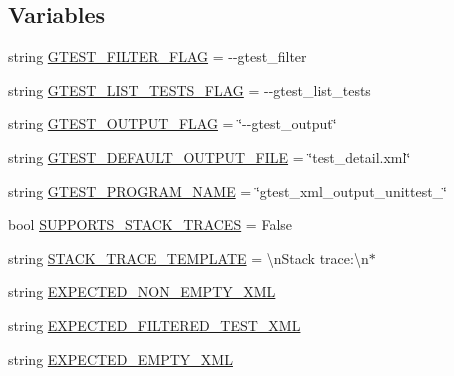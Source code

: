 \subsection*{Variables}
\begin{DoxyCompactItemize}
\item 
string \hyperlink{namespacegtest__xml__output__unittest_ab914acfbfbc3f6f5ee3f1e83134c7204}{G\+T\+E\+S\+T\+\_\+\+F\+I\+L\+T\+E\+R\+\_\+\+F\+L\+AG} = \textquotesingle{}-\/-\/gtest\+\_\+filter\textquotesingle{}
\item 
string \hyperlink{namespacegtest__xml__output__unittest_aafe4dd234e72bbb61f4f34689fbca5c4}{G\+T\+E\+S\+T\+\_\+\+L\+I\+S\+T\+\_\+\+T\+E\+S\+T\+S\+\_\+\+F\+L\+AG} = \textquotesingle{}-\/-\/gtest\+\_\+list\+\_\+tests\textquotesingle{}
\item 
string \hyperlink{namespacegtest__xml__output__unittest_a96dc60b3ea1b2ced315835227f77e10d}{G\+T\+E\+S\+T\+\_\+\+O\+U\+T\+P\+U\+T\+\_\+\+F\+L\+AG} = \char`\"{}-\/-\/gtest\+\_\+output\char`\"{}
\item 
string \hyperlink{namespacegtest__xml__output__unittest_a5591d7d52a46da09d06ed3e9ec18711a}{G\+T\+E\+S\+T\+\_\+\+D\+E\+F\+A\+U\+L\+T\+\_\+\+O\+U\+T\+P\+U\+T\+\_\+\+F\+I\+LE} = \char`\"{}test\+\_\+detail.\+xml\char`\"{}
\item 
string \hyperlink{namespacegtest__xml__output__unittest_ab89cc5b402310ef67bcaf38fa5017461}{G\+T\+E\+S\+T\+\_\+\+P\+R\+O\+G\+R\+A\+M\+\_\+\+N\+A\+ME} = \char`\"{}gtest\+\_\+xml\+\_\+output\+\_\+unittest\+\_\+\char`\"{}
\item 
bool \hyperlink{namespacegtest__xml__output__unittest_af342633908d453cee6e700fe6b73ef82}{S\+U\+P\+P\+O\+R\+T\+S\+\_\+\+S\+T\+A\+C\+K\+\_\+\+T\+R\+A\+C\+ES} = False
\item 
string \hyperlink{namespacegtest__xml__output__unittest_abd57c1a4124b74d2ba63d03734df491d}{S\+T\+A\+C\+K\+\_\+\+T\+R\+A\+C\+E\+\_\+\+T\+E\+M\+P\+L\+A\+TE} = \textquotesingle{}\textbackslash{}n\+Stack trace\+:\textbackslash{}n$\ast$\textquotesingle{}
\item 
string \hyperlink{namespacegtest__xml__output__unittest_ab6a01b4b81a702e476f53b1b3c4983c0}{E\+X\+P\+E\+C\+T\+E\+D\+\_\+\+N\+O\+N\+\_\+\+E\+M\+P\+T\+Y\+\_\+\+X\+ML}
\item 
string \hyperlink{namespacegtest__xml__output__unittest_a1adb060422f833cb8b99403d13144399}{E\+X\+P\+E\+C\+T\+E\+D\+\_\+\+F\+I\+L\+T\+E\+R\+E\+D\+\_\+\+T\+E\+S\+T\+\_\+\+X\+ML}
\item 
string \hyperlink{namespacegtest__xml__output__unittest_abe1569d019b037f006986004349c7cf3}{E\+X\+P\+E\+C\+T\+E\+D\+\_\+\+E\+M\+P\+T\+Y\+\_\+\+X\+ML}

\end{DoxyCompactItemize}
